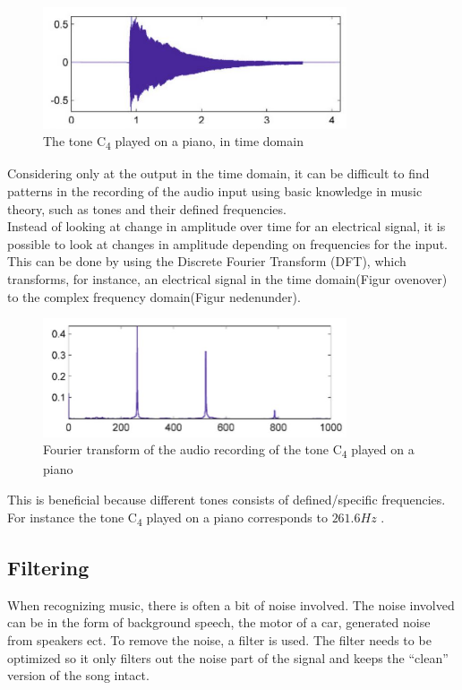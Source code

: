 \begin{figure}
    \centering
    \includegraphics[width=0.8\textwidth]{figures/toneC4time.JPG}
    \caption{The tone C\textsubscript{4} played on a piano, in time domain}
    \label{fig:toneC4time}
\end{figure}

Considering only at the output in the time domain, it can be difficult to find patterns in the recording of the audio input using basic knowledge in music theory, such as tones and their defined frequencies. \\

Instead of looking at change in amplitude over time for an electrical signal, it is possible to look at changes in amplitude depending on frequencies for the input. This can be done by using the Discrete Fourier Transform (DFT), which transforms, for instance, an electrical signal in the time domain(Figur ovenover) to the complex frequency domain(Figur nedenunder).

\begin{figure}
    \centering
    \includegraphics[width=0.8\textwidth]{figures/toneC4freq.JPG}
    \caption{Fourier transform of the audio recording of the tone C\textsubscript{4} played on a piano}
    \label{fig:toneC4freq}
\end{figure}

This is beneficial because different tones consists of defined/specific frequencies. For instance the tone C\textsubscript{4} played on a piano corresponds to $261.6 \si{Hz}$ \cite[29]{Meinard2015Fundamentals}.

\subsection{Filtering}
When recognizing music, there is often a bit of noise involved. The noise involved can be in the form of background speech, the motor of a car, generated noise from speakers ect. To remove the noise, a filter is used. The filter needs to be optimized so it only filters out the noise part of the signal and keeps the “clean” version of the song intact.\\

